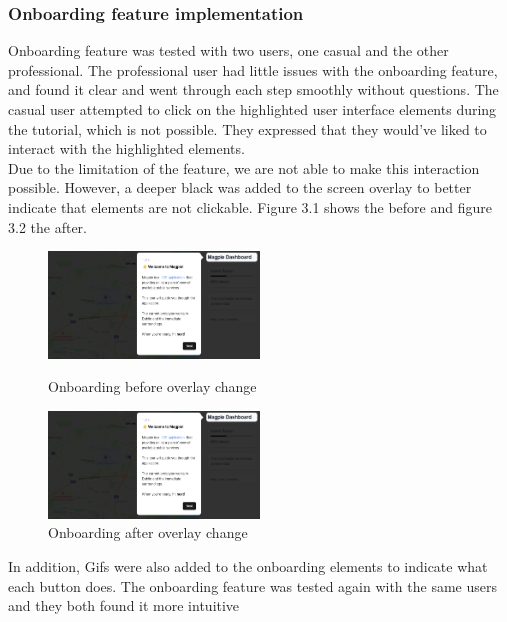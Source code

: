 \documentclass{report}
\begin{document}
\subsubsection{Onboarding feature implementation}
Onboarding feature was tested with two users, one casual and the other professional. The professional user had little issues with the onboarding
feature, and found it clear and went through each step smoothly without questions. The casual user attempted to click on the highlighted user
interface elements during the tutorial, which is not possible. They expressed that they would've liked to interact with the highlighted elements.\\
Due to the limitation of the feature, we are not able to make this interaction possible. However, a deeper black was added to the screen overlay to better indicate
that elements are not clickable. Figure 3.1 shows the before and figure 3.2 the after. \\
\begin{figure}
    \centering
    \includegraphics[width=0.5\textwidth]{Figures/fig10.png}
    \caption{Onboarding before overlay change}
    \label{fig:plot10}
    \includegraphics[width=0.5\textwidth]{Figures/fig11.png}
    \caption{Onboarding after overlay change}
    \label{fig:plot11}
\end{figure}
In addition, Gifs were also added to the onboarding elements to indicate what each
button does. The onboarding feature was tested again with the same users and
they both found it more intuitive
\end{document}
